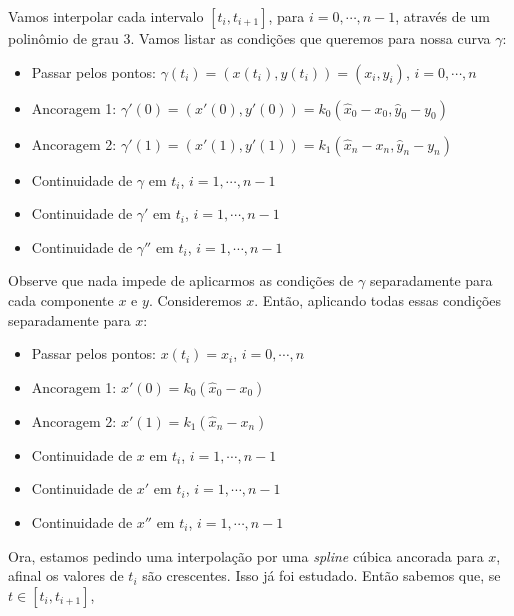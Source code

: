 \documentclass{article}
\begin{document}
\begin{enumerate}
\begin{enumerate}
                    Vamos interpolar cada intervalo $[t_i, t_{i+1}]$,
                    para $i=0,\cdots,n-1$, através de um polinômio de grau 3.
                    Vamos listar as condições que queremos para nossa curva $\gamma$:

                    \begin{itemize}
                        \item Passar pelos pontos: $\gamma(t_i) = (x(t_i), y(t_i)) = (x_i, y_i)$, $i = 0, \cdots, n$
                        \item Ancoragem 1: $\gamma'(0) = (x'(0), y'(0)) = k_0(\hat{x}_0 - x_0, \hat{y}_0 - y_0)$
                        \item Ancoragem 2: $\gamma'(1) = (x'(1), y'(1)) = k_1(\hat{x}_n - x_n, \hat{y}_n - y_n)$
                        \item Continuidade de $\gamma$ em $t_i$, $i = 1, \cdots, n-1$
                        \item Continuidade de $\gamma'$ em $t_i$, $i = 1, \cdots, n-1$
                        \item Continuidade de $\gamma''$ em $t_i$, $i = 1, \cdots, n-1$
                    \end{itemize}

                    Observe que nada impede de aplicarmos as condições de $\gamma$
                    separadamente para cada componente $x$ e $y$. Consideremos $x$.
                    Então, aplicando todas essas condições separadamente para $x$:

                    \begin{itemize}
                        \item Passar pelos pontos: $x(t_i) = x_i$, $i = 0, \cdots, n$
                        \item Ancoragem 1: $x'(0) = k_0(\hat{x}_0 - x_0)$
                        \item Ancoragem 2: $x'(1) = k_1(\hat{x}_n - x_n)$
                        \item Continuidade de $x$ em $t_i$, $i = 1, \cdots, n-1$
                        \item Continuidade de $x'$ em $t_i$, $i = 1, \cdots, n-1$
                        \item Continuidade de $x''$ em $t_i$, $i = 1, \cdots, n-1$
                    \end{itemize}

                    Ora, estamos pedindo uma interpolação por uma \textit{spline}
                    cúbica ancorada para $x$, afinal os valores de $t_i$ são crescentes.
                    Isso já foi estudado. Então sabemos que,
                    se $t \in [t_i, t_{i+1}]$,


\end{enumerate}
\end{enumerate}
\end{document}
